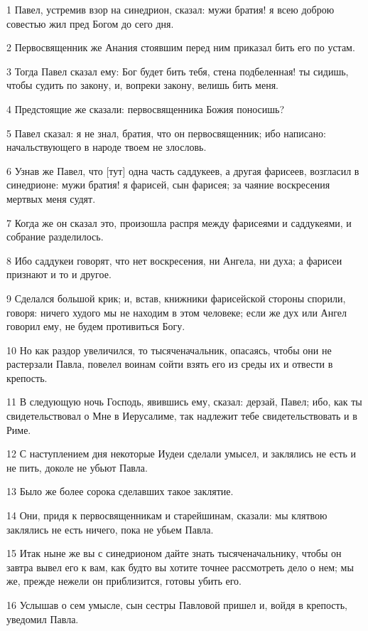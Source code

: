 \par 1 Павел, устремив взор на синедрион, сказал: мужи братия! я всею доброю совестью жил пред Богом до сего дня.
\par 2 Первосвященник же Анания стоявшим перед ним приказал бить его по устам.
\par 3 Тогда Павел сказал ему: Бог будет бить тебя, стена подбеленная! ты сидишь, чтобы судить по закону, и, вопреки закону, велишь бить меня.
\par 4 Предстоящие же сказали: первосвященника Божия поносишь?
\par 5 Павел сказал: я не знал, братия, что он первосвященник; ибо написано: начальствующего в народе твоем не злословь.
\par 6 Узнав же Павел, что [тут] одна часть саддукеев, а другая фарисеев, возгласил в синедрионе: мужи братия! я фарисей, сын фарисея; за чаяние воскресения мертвых меня судят.
\par 7 Когда же он сказал это, произошла распря между фарисеями и саддукеями, и собрание разделилось.
\par 8 Ибо саддукеи говорят, что нет воскресения, ни Ангела, ни духа; а фарисеи признают и то и другое.
\par 9 Сделался большой крик; и, встав, книжники фарисейской стороны спорили, говоря: ничего худого мы не находим в этом человеке; если же дух или Ангел говорил ему, не будем противиться Богу.
\par 10 Но как раздор увеличился, то тысяченачальник, опасаясь, чтобы они не растерзали Павла, повелел воинам сойти взять его из среды их и отвести в крепость.
\par 11 В следующую ночь Господь, явившись ему, сказал: дерзай, Павел; ибо, как ты свидетельствовал о Мне в Иерусалиме, так надлежит тебе свидетельствовать и в Риме.
\par 12 С наступлением дня некоторые Иудеи сделали умысел, и заклялись не есть и не пить, доколе не убьют Павла.
\par 13 Было же более сорока сделавших такое заклятие.
\par 14 Они, придя к первосвященникам и старейшинам, сказали: мы клятвою заклялись не есть ничего, пока не убьем Павла.
\par 15 Итак ныне же вы с синедрионом дайте знать тысяченачальнику, чтобы он завтра вывел его к вам, как будто вы хотите точнее рассмотреть дело о нем; мы же, прежде нежели он приблизится, готовы убить его.
\par 16 Услышав о сем умысле, сын сестры Павловой пришел и, войдя в крепость, уведомил Павла.
